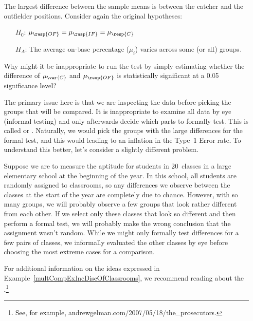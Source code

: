 \begin{examplewrap}
\begin{nexample}{The largest difference between the sample means
    is between the catcher and the outfielder positions.
    Consider again the original hypotheses:
    \begin{itemize}
    \setlength{\itemsep}{0mm}
    \item[$H_0$:]
        $\mu_{\resp{OF}} = \mu_{\resp{IF}} = \mu_{\resp{C}}$
    \item[$H_A$:]
        The average on-base percentage ($\mu_i$) varies
        across some (or all) groups.
    \end{itemize}
    Why might it be inappropriate to run the test by simply
    estimating whether the difference of $\mu_{\var{C}}$ and
    $\mu_{\resp{OF}}$ is statistically significant at a 0.05
    significance level?}
  \label{multCompExIncDiscOfClassrooms}%
  The primary issue here is that we are inspecting the data
  before picking the groups that will be compared.
  It is inappropriate to examine all data by eye
  (informal testing) and only afterwards decide which parts
  to formally test.
  This is called  or .
  Naturally, we would pick the groups with the large
  differences for the formal test, and this would leading
  to an inflation in the Type~1 Error rate.
  To understand this better, let's consider a slightly
  different problem.

  Suppose we are to measure the aptitude for students in
  20~classes in a large elementary school at the beginning
  of the year.
  In this school, all students are randomly assigned to
  classrooms, so any differences we observe between the
  classes at the start of the year are completely due
  to chance.
  However, with so many groups, we will probably observe
  a few groups that look rather different from each other.
  If we select only these classes that look so different
  and then perform a formal test,
  we will probably make the wrong conclusion that the
  assignment wasn't random.
  While we might only formally test differences
  for a few pairs of classes, we informally evaluated
  the other classes by eye before choosing the most extreme
  cases for a comparison.
\end{nexample}
\end{examplewrap}

For additional information on the ideas expressed in
Example~\ref{multCompExIncDiscOfClassrooms}, we recommend
reading about the
.\footnote{See, for example,
      {andrewgelman.com/2007/05/18/the\_prosecutors}.}

